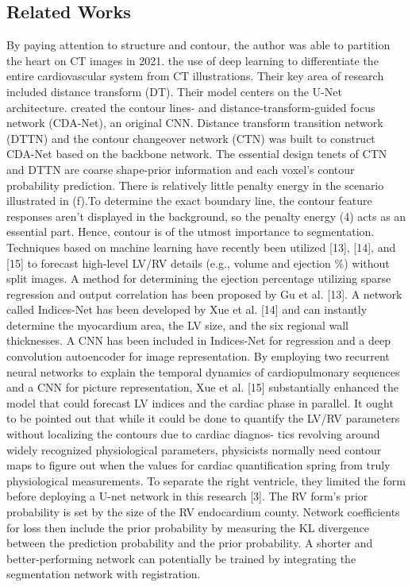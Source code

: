 \documentclass[runningheads]{llncs}
\begin{document}
\subsection{Related Works}
\label{related}
By paying attention to structure and contour, the author was able to partition the heart on CT images in 2021. the use of deep learning to differentiate the entire cardiovascular system from CT illustrations. Their key area of research included distance transform (DT). Their model centers on the U-Net architecture. created the contour lines- and distance-transform-guided focus network (CDA-Net), an original CNN. Distance transform transition network (DTTN) and the contour changeover network (CTN) was built to construct CDA-Net based on the backbone network. The essential design tenets of CTN and DTTN are coarse shape-prior information and each voxel’s contour probability prediction. There is relatively little penalty energy in the scenario illustrated in (f).To determine the exact boundary line, the contour feature responses aren’t displayed in the background, so the penalty energy (4) acts as an essential part. Hence, contour is of the utmost importance to segmentation.
Techniques based on machine learning have recently been utilized [13], [14], and
[15] to forecast high-level LV/RV details (e.g., volume and ejection \%) without split images. A method for determining the ejection percentage utilizing sparse regression and output correlation has been proposed by Gu et al. [13]. A network called Indices-Net has been developed by Xue et al. [14] and can instantly determine the myocardium area, the LV size, and the six regional wall thicknesses. A CNN has been included in Indices-Net for regression and a deep convolution autoencoder for image representation. By employing two recurrent neural networks to explain the temporal dynamics of cardiopulmonary sequences and a CNN for picture representation,
Xue et al. [15] substantially enhanced the model that could forecast LV indices and the cardiac phase in parallel. It ought to be pointed out that while it could be done to quantify the LV/RV parameters without localizing the contours due to cardiac diagnos- tics revolving around widely recognized physiological parameters, physicists normally need contour maps to figure out when the values for cardiac quantification spring from truly physiological measurements.
To separate the right ventricle, they limited the form before deploying a U-net network in this research [3]. The RV form's prior probability is set by the size of the RV endocardium county. Network coefficients for loss then include the prior probability by measuring the KL divergence between the prediction probability and the prior probability. A shorter and better-performing network can potentially be trained by integrating the segmentation network with registration.
\end{document}
